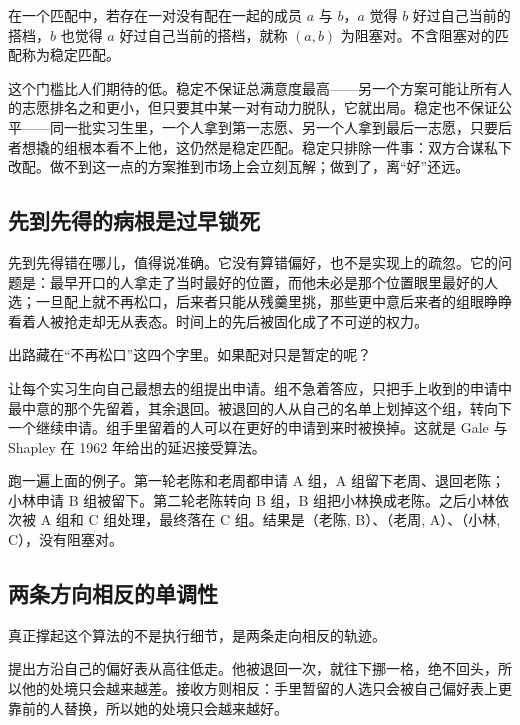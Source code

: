 \begin{definition}
在一个匹配中，若存在一对没有配在一起的成员 \(a\) 与 \(b\)，\(a\) 觉得 \(b\) 好过自己当前的搭档，\(b\) 也觉得 \(a\) 好过自己当前的搭档，就称 \((a,b)\) 为阻塞对。不含阻塞对的匹配称为稳定匹配。
\end{definition}

这个门槛比人们期待的低。稳定不保证总满意度最高——另一个方案可能让所有人的志愿排名之和更小，但只要其中某一对有动力脱队，它就出局。稳定也不保证公平——同一批实习生里，一个人拿到第一志愿、另一个人拿到最后一志愿，只要后者想撬的组根本看不上他，这仍然是稳定匹配。稳定只排除一件事：双方合谋私下改配。做不到这一点的方案推到市场上会立刻瓦解；做到了，离``好''还远。

\subsection{先到先得的病根是过早锁死}

先到先得错在哪儿，值得说准确。它没有算错偏好，也不是实现上的疏忽。它的问题是：最早开口的人拿走了当时最好的位置，而他未必是那个位置眼里最好的人选；一旦配上就不再松口，后来者只能从残羹里挑，那些更中意后来者的组眼睁睁看着人被抢走却无从表态。时间上的先后被固化成了不可逆的权力。

出路藏在``不再松口''这四个字里。如果配对只是暂定的呢？

让每个实习生向自己最想去的组提出申请。组不急着答应，只把手上收到的申请中最中意的那个先留着，其余退回。被退回的人从自己的名单上划掉这个组，转向下一个继续申请。组手里留着的人可以在更好的申请到来时被换掉。这就是 Gale 与 Shapley 在 1962 年给出的延迟接受算法。

跑一遍上面的例子。第一轮老陈和老周都申请 A 组，A 组留下老周、退回老陈；小林申请 B 组被留下。第二轮老陈转向 B 组，B 组把小林换成老陈。之后小林依次被 A 组和 C 组处理，最终落在 C 组。结果是（老陈, B）、（老周, A）、（小林, C），没有阻塞对。

\subsection{两条方向相反的单调性}

真正撑起这个算法的不是执行细节，是两条走向相反的轨迹。

提出方沿自己的偏好表从高往低走。他被退回一次，就往下挪一格，绝不回头，所以他的处境只会越来越差。接收方则相反：手里暂留的人选只会被自己偏好表上更靠前的人替换，所以她的处境只会越来越好。

